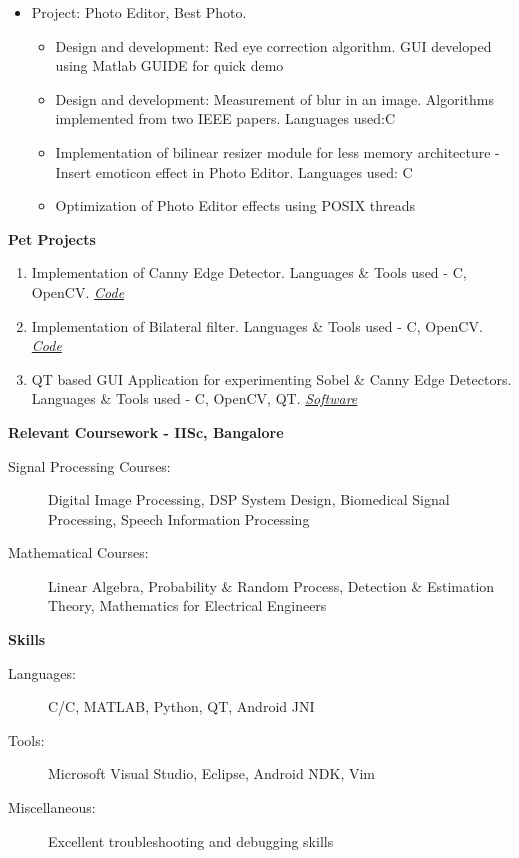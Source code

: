 \documentclass[letterpaper,11pt]{article}
\def\CC{{C\nolinebreak[4]\hspace{-.05em}\raisebox{.4ex}{\tiny\bf ++}}}
\newcommand{\resitem}[1]{\item #1 \vspace{-2pt}}
\newcommand{\resheading}[1]{{\large \colorbox{mygrey}{\begin{minipage}{\textwidth}{\textbf{#1 \vphantom{p\^{E}}}}\end{minipage}}}}
\begin{document}
\begin{itemize}
		\begin{itemize}
				\resitem[]{\faCircleO \hspace{1mm}Project: Photo Editor, Best Photo.}
				\begin{itemize}
						\resitem{Design and development: Red eye correction algorithm. GUI developed using Matlab GUIDE for quick demo }
						\resitem{Design and development: Measurement of blur in an image. Algorithms implemented from two IEEE papers. 
							Languages used:\CC}
						\resitem{Implementation of bilinear resizer module for less memory architecture - Insert emoticon effect in Photo Editor. 
							Languages used: C}
						\resitem{Optimization of Photo Editor effects using POSIX threads}
				\end{itemize}
		\end{itemize}

\end{itemize}

\resheading{Pet Projects}
\begin{enumerate}
	\item Implementation of Canny Edge Detector. Languages \& Tools used - \CC, OpenCV.
		\faGithub \hspace{1mm}\href{https://github.com/nrupatunga/Canny-Edge-Detector}{\emph{Code}}
	\item Implementation of Bilateral filter. Languages \& Tools used - \CC, OpenCV.
		\faGithub \hspace{1mm}\href{https://github.com/nrupatunga/Bilateral-Filter}{\emph{Code}}
	\item QT based GUI Application for experimenting Sobel \& Canny Edge Detectors. Languages \& Tools used - \CC, OpenCV, QT. 
		\faWindows \hspace{1mm}\href{https://github.com/nrupatunga/Computer-Vision-Tool}{\emph{Software}}
\end{enumerate}

\resheading{Relevant Coursework - IISc, Bangalore}
\begin{description}
	\item[Signal Processing Courses:]
		Digital Image Processing, DSP System Design, Biomedical Signal Processing, Speech Information Processing
	\item[Mathematical Courses:]
		Linear Algebra, Probability \& Random Process, Detection \& Estimation Theory, Mathematics for Electrical Engineers
\end{description}

\resheading{Skills}
\begin{description}
	\item[Languages:]
		C/\CC, MATLAB, Python, QT, Android JNI
	\item[Tools:]
		Microsoft Visual Studio, Eclipse, Android NDK, Vim
	\item[Miscellaneous:]
		Excellent troubleshooting and debugging skills
\end{description}
\end{document}
